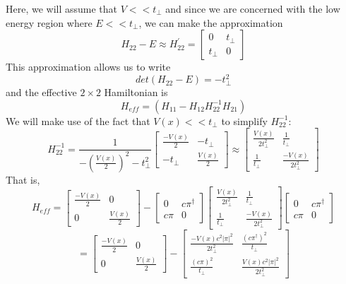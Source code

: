 \documentclass{article}
\begin{document}
Here, we will assume that $V << t_{\perp}$ and since we are concerned with the
low energy region where $E << t_{\perp}$, we can make the approximation
$$
H_{22} - E \approx H_{22}^{'} =
\begin{bmatrix}
0 & t_{\perp}\\
t_{\perp} & 0
\end{bmatrix}
$$
This approximation allows us to write
$$
det(H_{22} - E) = -t_{\perp}^{2}
$$
and the effective $2\times2$ Hamiltonian is
\begin{equation}
H_{eff} = \left ( H_{11} - H_{12}H_{22}^{-1}H_{21} \right )
\end{equation}
We will make use of the fact that $V(x) << t_{\perp}$ to simplify $H_{22}^{-1}$:
$$
H_{22}^{-1} = \frac{1}{-(\frac{V(x)}{2})^2 - t_{\perp}^{2}}
\begin{bmatrix}
\frac{-V(x)}{2} & -t_{\perp}\\
-t_{\perp} & \frac{V(x)}{2}
\end{bmatrix}
\approx
\begin{bmatrix}
\frac{V(x)}{2t_{\perp}^{2}} & \frac{1}{t_{\perp}}\\
\frac{1}{t_{\perp}} & \frac{-V(x)}{2t_{\perp}^{2}}
\end{bmatrix}
$$
That is,
\begin{equation}
H_{eff} =
\begin{bmatrix}
\frac{-V(x)}{2} & 0\\
0 & \frac{V(x)}{2}
\end{bmatrix}
-
\begin{bmatrix}
0 & c\pi^{\dagger}\\
c\pi & 0
\end{bmatrix}
\begin{bmatrix}
\frac{V(x)}{2t_{\perp}^{2}} & \frac{1}{t_{\perp}}\\
\frac{1}{t_{\perp}} & \frac{-V(x)}{2t_{\perp}^{2}}
\end{bmatrix}
\begin{bmatrix}
0 & c\pi^{\dagger}\\
c\pi & 0
\end{bmatrix}
\end{equation}
$$
=
\begin{bmatrix}
\frac{-V(x)}{2} & 0\\
0 & \frac{V(x)}{2}
\end{bmatrix}
-
\begin{bmatrix}
\frac{-V(x)c^{2}|\pi|^{2}}{2t_{\perp}^2} & \frac{(c\pi^{\dagger})^{2}}{t_{\perp}}\\
\frac{(c\pi)^{2}}{t_{\perp}} & \frac{V(x)c^{2}|\pi|^{2}}{2t_{\perp}^2}
\end{bmatrix}
$$
\end{document}
